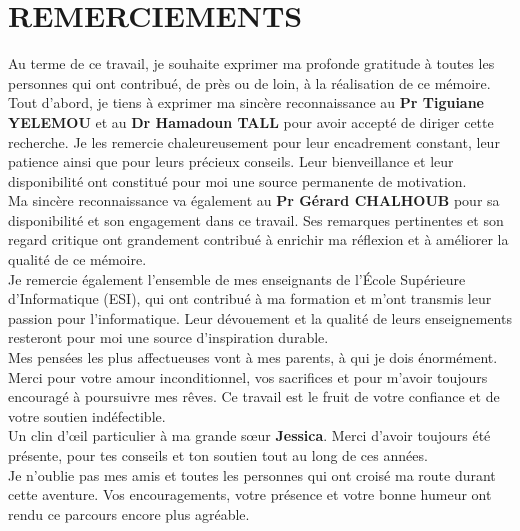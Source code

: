\documentclass[a4paper,12pt]{report}
\begin{document}
	\section*{\centering REMERCIEMENTS}
	
	Au terme de ce travail, je souhaite exprimer ma profonde gratitude à toutes les personnes qui ont contribué, de près ou de loin, à la réalisation de ce mémoire.\\
	
	Tout d'abord, je tiens à exprimer ma sincère reconnaissance au \textbf{Pr Tiguiane YELEMOU} et au \textbf{Dr Hamadoun TALL} pour avoir accepté de diriger cette recherche. Je les remercie chaleureusement pour leur encadrement constant, leur patience ainsi que pour leurs précieux conseils. Leur bienveillance et leur disponibilité ont constitué pour moi une source permanente de motivation.\\
	
	Ma sincère reconnaissance va également au \textbf{Pr Gérard CHALHOUB} pour sa disponibilité et son engagement dans ce travail. Ses remarques pertinentes et son regard critique ont grandement contribué à enrichir ma réflexion et à améliorer la qualité de ce mémoire.\\
	
	Je remercie également l'ensemble de mes enseignants de l'École Supérieure d'Informatique (ESI), qui ont contribué à ma formation et m'ont transmis leur passion pour l'informatique. Leur dévouement et la qualité de leurs enseignements resteront pour moi une source d'inspiration durable.\\
	
	Mes pensées les plus affectueuses vont à mes parents, à qui je dois énormément. Merci pour votre amour inconditionnel, vos sacrifices et pour m'avoir toujours encouragé à poursuivre mes rêves. Ce travail est le fruit de votre confiance et de votre soutien indéfectible.\\
	
	Un clin d'œil particulier à ma grande sœur \textbf{Jessica}. Merci d'avoir toujours été présente, pour tes conseils et ton soutien tout au long de ces années.\\
	
	Je n'oublie pas mes amis et toutes les personnes qui ont croisé ma route durant cette aventure. Vos encouragements, votre présence et votre bonne humeur ont rendu ce parcours encore plus agréable.\\
	
\end{document}
